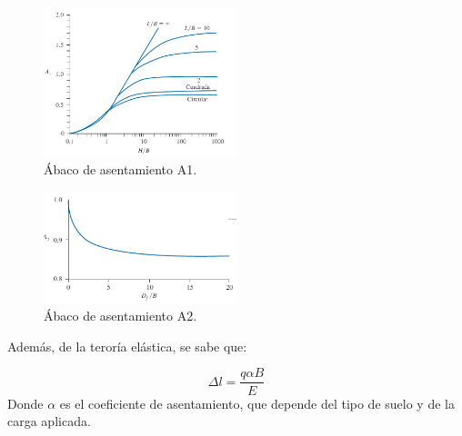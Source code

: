 \documentclass{article} %
\begin{document}
\begin{figure}[h]
    \centering
    \includegraphics[width=0.5\textwidth]{Graficos/asentamiento_2.PNG}
    \caption{Ábaco de asentamiento A1.}
    \label{fig:asentamiento2}
\end{figure}


\begin{figure}[h]
    \centering
    \includegraphics[width=0.5\textwidth]{Graficos/asentamiento_1.PNG}
    \caption{Ábaco de asentamiento A2.}
    \label{fig:asentamiento3}
\end{figure}

Además, de la teroría elástica, se sabe que:

\[
\Delta l = \frac{q \alpha B}{E}
\]
Donde $\alpha$ es el coeficiente de asentamiento, que depende del tipo de suelo y de la carga aplicada.\\
\end{document}

